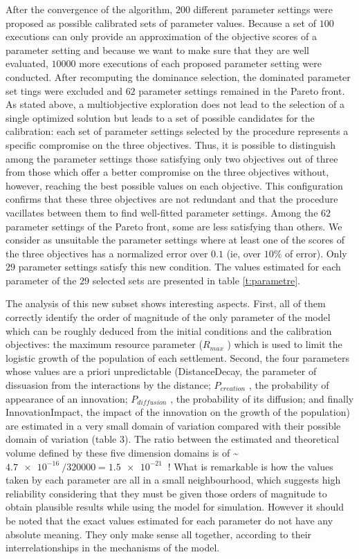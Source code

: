 After the convergence of the algorithm, $200$ different parameter settings were proposed as possible calibrated sets of parameter values. Because a set of $100$ executions can only provide an approximation of the objective scores of a parameter setting and because we want to make sure that they are well evaluated, $\num{10000}$ more executions of each proposed parameter setting were conducted. After recomputing the dominance selection, the dominated parameter set­ tings were excluded and $62$ parameter settings remained in the Pareto front. As stated above, a multiobjective exploration does not lead to the selection of a single optimized solution but leads to a set of possible candidates for the calibration: each set of parameter settings selected by the procedure represents a specific compromise on the three objectives. Thus, it is possible to distinguish among the parameter settings those satisfying only two objectives out of three from those which offer a better compromise on the three objectives without, however, reaching the best possible values on each objective. This configuration confirms that these three objectives are not redundant and that the procedure vacillates between them to find well-fitted parameter settings. Among the $62$ parameter settings of the Pareto front, some are less satisfying than others. We consider as unsuitable the parameter settings where at least one of the scores of the three objectives has a normalized error over $0.1$ (ie, over $10\%$ of error). Only $29$ parameter settings satisfy this new condition. The values estimated for each parameter of the $29$ selected sets are presented in table \ref{t:parametre}.


The analysis of this new subset shows interesting aspects. First, all of them correctly identify the order of magnitude of the only parameter of the model which can be roughly deduced from the initial conditions and the calibration objectives: the maximum resource parameter ($R_{max}$ ) which is used to limit the logistic growth of the population of each settlement. Second, the four parameters whose values are a priori unpredictable (DistanceDecay, the parameter of dissuasion from the interactions by the distance; $P_{creation}$ , the probability of appearance of an innovation; $P_{diffusion}$ , the probability of its diffusion; and finally InnovationImpact, the impact of the innovation on the growth of the population) are estimated in a very small domain of variation compared with their possible domain of variation (table 3). The ratio between the estimated and theoretical volume defined by these five dimension domains is of \~ $\SI{4.7e-16}{} / \num{320000}{} = \SI{1.5e-21}{}$ ! What is remarkable is how the values taken by each parameter are all in a small neighbourhood, which suggests high reliability considering that they must be given those orders of magnitude to obtain plausible results while using the model for simulation. However it should be noted that the exact values estimated for each parameter do not have any absolute meaning. They only make sense all together, according to their interrelationships in the mechanisms of the model.

